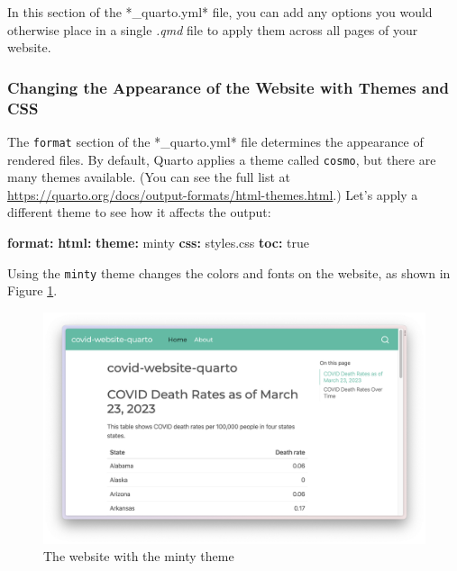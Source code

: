 \documentclass[
]{book}
\newenvironment{Shaded}{\begin{snugshade}}{\end{snugshade}}
\newcommand{\AttributeTok}[1]{\textcolor[rgb]{0.13,0.29,0.53}{#1}}
\newcommand{\CharTok}[1]{\textcolor[rgb]{0.31,0.60,0.02}{#1}}
\newcommand{\FunctionTok}[1]{\textcolor[rgb]{0.13,0.29,0.53}{\textbf{#1}}}
\newcommand{\KeywordTok}[1]{\textcolor[rgb]{0.13,0.29,0.53}{\textbf{#1}}}
\begin{document}
In this section of the *\_quarto.yml* file, you can add any options you would otherwise place in a single \emph{.qmd} file to apply them across all pages of your website.

\hypertarget{changing-the-appearance-of-the-website-with-themes-and-css}{%
\subsubsection*{Changing the Appearance of the Website with Themes and CSS}\label{changing-the-appearance-of-the-website-with-themes-and-css}}

The \texttt{format} section of the *\_quarto.yml* file determines the appearance of rendered files. By default, Quarto applies a theme called \texttt{cosmo}, but there are many themes available. (You can see the full list at \url{https://quarto.org/docs/output-formats/html-themes.html}.) Let's apply a different theme to see how it affects the output:

\begin{Shaded}
\begin{Highlighting}[]
\FunctionTok{format}\KeywordTok{:}
\AttributeTok{  }\FunctionTok{html}\KeywordTok{:}
\AttributeTok{    }\FunctionTok{theme}\KeywordTok{:}\AttributeTok{ minty}
\AttributeTok{    }\FunctionTok{css}\KeywordTok{:}\AttributeTok{ styles.css}
\AttributeTok{    }\FunctionTok{toc}\KeywordTok{:}\AttributeTok{ }\CharTok{true}
\end{Highlighting}
\end{Shaded}

Using the \texttt{minty} theme changes the colors and fonts on the website, as shown in Figure \ref{fig:covid-website-minty}.

\begin{figure}
\includegraphics[width=1\linewidth]{assets/covid-website-minty} \caption{The website with the minty theme}\label{fig:covid-website-minty}
\end{figure}
\end{document}
